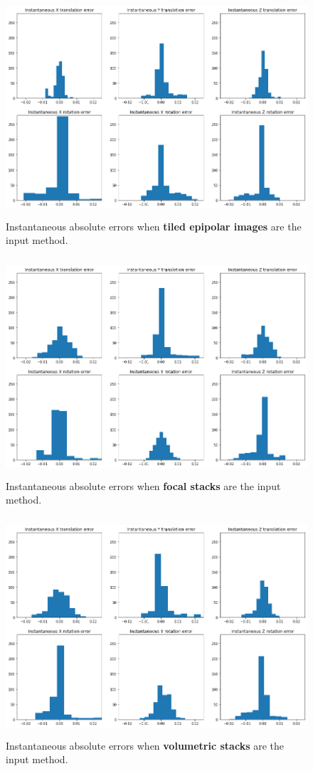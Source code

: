 \begin{figure}[H]
    \centering
    \includegraphics[width=\textwidth, height=3.2in]{images/result-examples/pose/errors/multiwarp-epi.png}
    \caption{Instantaneous absolute errors when \textbf{tiled epipolar images} are the input method.}
\end{figure}
\begin{figure}[H]
    \centering
    \includegraphics[width=\textwidth, height=3.2in]{images/result-examples/pose/errors/multiwarp-focalstack-17-5.png}
    \caption{Instantaneous absolute errors when \textbf{focal stacks} are the input method.}
\end{figure}
\begin{figure}[H]
    \centering
    \includegraphics[width=\textwidth, height=3.2in]{images/result-examples/pose/errors/multiwarp-stack.png}
    \caption{Instantaneous absolute errors when \textbf{volumetric stacks} are the input method.}
\end{figure}
